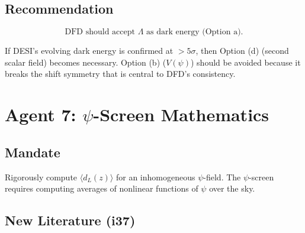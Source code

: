 \documentclass[11pt,a4paper]{article}
\begin{document}
\subsection{Recommendation}

\begin{equation}
\boxed{\text{DFD should accept } \Lambda \text{ as dark energy (Option a).}}
\end{equation}

If DESI's evolving dark energy is confirmed at $>5\sigma$, then Option (d) (second scalar field) becomes necessary. Option (b) ($V(\psi)$) should be avoided because it breaks the shift symmetry that is central to DFD's consistency.

\newpage
\section{Agent 7: $\psi$-Screen Mathematics}
\label{sec:agent7}

\subsection{Mandate}

Rigorously compute $\langle d_L(z)\rangle$ for an inhomogeneous $\psi$-field. The $\psi$-screen requires computing averages of nonlinear functions of $\psi$ over the sky.

\subsection{New Literature (i37)}
\end{document}
